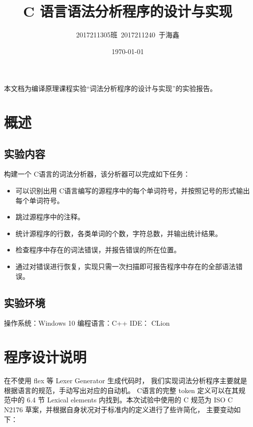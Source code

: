 \documentclass[blue,normal,cn]{elegantnote}
\title{C 语言语法分析程序的设计与实现}
\date{\today}
\author{2017211305班\ 2017211240\ 于海鑫}
\begin{document}
\maketitle
本文档为编译原理课程实验``词法分析程序的设计与实现''的实验报告。

\section{概述}
\subsection{实验内容}

构建一个 C语言的词法分析器，该分析器可以完成如下任务：

\begin{itemize}
	\item 可以识别出用 C语言编写的源程序中的每个单词符号，并按照记号的形式输出每个单词符号。
	\item 跳过源程序中的注释。
	\item 统计源程序的行数，各类单词的个数，字符总数，并输出统计结果。
	\item 检查程序中存在的词法错误，并报告错误的所在位置。
	\item 通过对错误进行恢复，实现只需一次扫描即可报告程序中存在的全部语法错误。
\end{itemize}

\subsection{实验环境}
操作系统：Windows 10
编程语言：C++
IDE： CLion

\section{程序设计说明}

在不使用 flex 等 Lexer Generator 生成代码时，
我们实现词法分析程序主要就是根据语言的规范，手动写出对应的自动机。
C语言的完整 token 定义可以在其规范中的 6.4 节 
Lexical elements 内找到。本次试验中使用的 C 规范为 
ISO C N2176 草案，并根据自身状况对于标准内的定义进行了些许简化，
主要变动如下：
\end{document}
